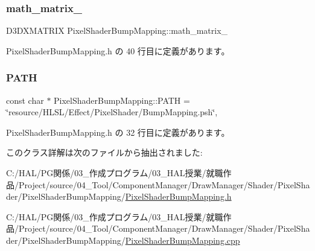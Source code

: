 \subsubsection{\texorpdfstring{math\+\_\+matrix\+\_\+}{math\_matrix\_}}
{\footnotesize\ttfamily D3\+D\+X\+M\+A\+T\+R\+IX Pixel\+Shader\+Bump\+Mapping\+::math\+\_\+matrix\+\_\+\hspace{0.3cm}{\ttfamily [private]}}



 Pixel\+Shader\+Bump\+Mapping.\+h の 40 行目に定義があります。

\mbox{\label{class_pixel_shader_bump_mapping_a62c06006cdfad9bc6158b5d779aa732c}} 
\subsubsection{\texorpdfstring{P\+A\+TH}{PATH}}
{\footnotesize\ttfamily const char $\ast$ Pixel\+Shader\+Bump\+Mapping\+::\+P\+A\+TH = \char`\"{}resource/H\+L\+SL/Effect/Pixel\+Shader/Bump\+Mapping.\+psh\char`\"{}\hspace{0.3cm}{\ttfamily [static]}, {\ttfamily [private]}}



 Pixel\+Shader\+Bump\+Mapping.\+h の 32 行目に定義があります。



このクラス詳解は次のファイルから抽出されました\+:\begin{DoxyCompactItemize}
\item 
C\+:/\+H\+A\+L/\+P\+G関係/03\+\_\+作成プログラム/03\+\_\+\+H\+A\+L授業/就職作品/\+Project/source/04\+\_\+\+Tool/\+Component\+Manager/\+Draw\+Manager/\+Shader/\+Pixel\+Shader/\+Pixel\+Shader\+Bump\+Mapping/\mbox{\hyperlink{_pixel_shader_bump_mapping_8h}{Pixel\+Shader\+Bump\+Mapping.\+h}}\item 
C\+:/\+H\+A\+L/\+P\+G関係/03\+\_\+作成プログラム/03\+\_\+\+H\+A\+L授業/就職作品/\+Project/source/04\+\_\+\+Tool/\+Component\+Manager/\+Draw\+Manager/\+Shader/\+Pixel\+Shader/\+Pixel\+Shader\+Bump\+Mapping/\mbox{\hyperlink{_pixel_shader_bump_mapping_8cpp}{Pixel\+Shader\+Bump\+Mapping.\+cpp}}\end{DoxyCompactItemize}
